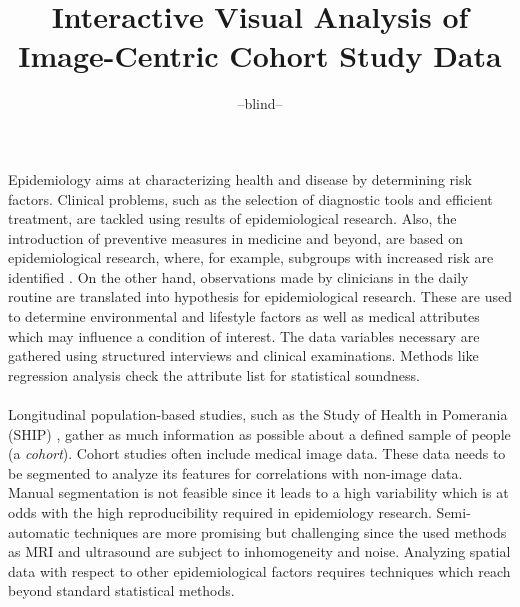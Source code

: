 \documentclass[journal]{style/vgtc} 			          %
\title{Interactive Visual Analysis of Image-Centric Cohort Study Data}
\author{--blind--}
\begin{document}


\maketitle

Epidemiology aims at characterizing health and disease by determining risk factors.
%
Clinical problems, such as the selection of diagnostic tools and efficient treatment, are tackled using results of epidemiological research.
%
Also, the introduction of preventive measures in medicine and beyond, are based on epidemiological research, where, for example, subgroups with increased risk are identified \cite{Fletcher2012}.
%
On the other hand, observations made by clinicians in the daily routine are translated into hypothesis for epidemiological research.
%
These are used to determine environmental and lifestyle factors as well as medical attributes which may influence a condition of interest.
%
The data variables necessary are gathered using structured interviews and clinical examinations.
%
Methods like regression analysis check the attribute list for statistical soundness.
%
\\\\
Longitudinal population-based studies, such as the Study of Health in Pomerania (SHIP) \cite{Volzke2011}, gather as much information as possible about a defined sample of people (a \emph{cohort}).
%
%
Cohort studies often include medical image data.
%
These data needs to be segmented to analyze its features for correlations with non-image data.
%
Manual segmentation is not feasible since it leads to a high variability which is at odds with the high reproducibility required in epidemiology research.
%
Semi-automatic techniques are more promising but challenging since the used methods as MRI and ultrasound are subject to inhomogeneity and noise.
%
Analyzing spatial data with respect to other epidemiological factors requires techniques which reach beyond standard statistical methods.
\end{document}
